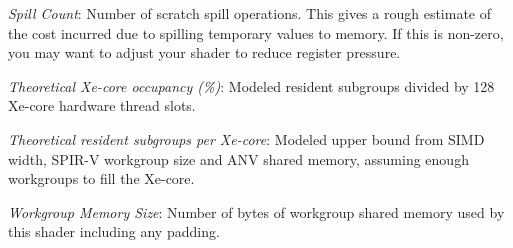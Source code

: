 \noindent\textit{Spill Count}: Number of scratch spill operations.  This gives a rough estimate of the cost incurred due to spilling temporary values to memory.  If this is non-zero, you may want to adjust your shader to reduce register pressure.\par
\noindent\textit{Theoretical Xe-core occupancy (\%)}: Modeled resident subgroups divided by 128 Xe-core hardware thread slots.\par
\noindent\textit{Theoretical resident subgroups per Xe-core}: Modeled upper bound from SIMD width, SPIR-V workgroup size and ANV shared memory, assuming enough workgroups to fill the Xe-core.\par
\noindent\textit{Workgroup Memory Size}: Number of bytes of workgroup shared memory used by this shader including any padding.\par
